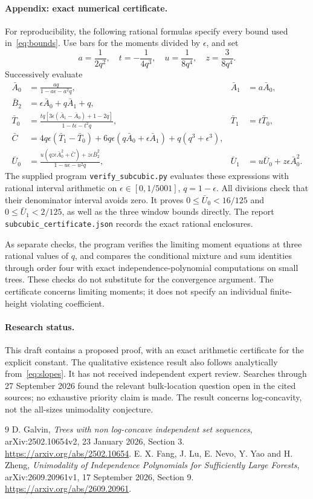 \documentclass[11pt]{article}
\begin{document}
\paragraph{Appendix: exact numerical certificate.}
For reproducibility, the following rational formulas specify every bound used in~\eqref{eq:bounds}. Use bars for the moments divided by $\epsilon$, and set
\[
 a=\frac1{2q^2},\quad t=-\frac1{4q^3},\quad
 u=\frac1{8q^4},\quad z=\frac3{8q^4}.
\]
Successively evaluate
\begin{align*}
 \bar A_0&=\frac{aq}{1-a\epsilon-a^2q},&\bar A_1&=a\bar A_0,\\
 \bar B_2&=\epsilon\bar A_0+q\bar A_1+q,\\
 \bar T_0&=\frac{tq[3\epsilon(\bar A_1-\bar A_0)+1-2q]}{1-t\epsilon-t^2q},
 &\bar T_1&=t\bar T_0,\\
 \bar C&=4q\epsilon(\bar T_1-\bar T_0)
  +6q\epsilon(q\bar A_0+\epsilon\bar A_1)+q(q^3+\epsilon^3),\\
 \bar U_0&=\frac{u(qz\epsilon\bar A_0^2+\bar C)+z\epsilon\bar B_2^2}
 {1-u\epsilon-u^2q},
 &\bar U_1&=u\bar U_0+z\epsilon\bar A_0^2.
\end{align*}
The supplied program \texttt{verify\_subcubic.py} evaluates these expressions with rational interval arithmetic on $\epsilon\in[0,1/5001]$, $q=1-\epsilon$. All divisions check that their denominator interval avoids zero. It proves $0\le\bar U_0<16/125$ and $0\le\bar U_1<2/125$, as well as the three window bounds directly. The report \texttt{subcubic\_certificate.json} records the exact rational enclosures.

As separate checks, the program verifies the limiting moment equations at three rational values of $q$, and compares the conditional mixture and sum identities through order four with exact independence-polynomial computations on small trees. These checks do not substitute for the convergence argument. The certificate concerns limiting moments; it does not specify an individual finite-height violating coefficient.

\paragraph{Research status.}
This draft contains a proposed proof, with an exact arithmetic certificate for the explicit constant. The qualitative existence result also follows analytically from~\eqref{eq:slopes}. It has not received independent expert review. Searches through 27 September 2026 found the relevant bulk-location question open in the cited sources; no exhaustive priority claim is made. The result concerns log-concavity, not the all-sizes unimodality conjecture.

\begin{thebibliography}{9}\small
{} D. Galvin, \emph{Trees with non log-concave independent set sequences}, arXiv:2502.10654v2, 23 January 2026, Section 3. \url{https://arxiv.org/abs/2502.10654}.
 E. X. Fang, J. Lu, E. Nevo, Y. Yao and H. Zheng, \emph{Unimodality of Independence Polynomials for Sufficiently Large Forests}, arXiv:2609.20961v1, 17 September 2026, Section 9. \url{https://arxiv.org/abs/2609.20961}.
\end{thebibliography}
\end{document}
